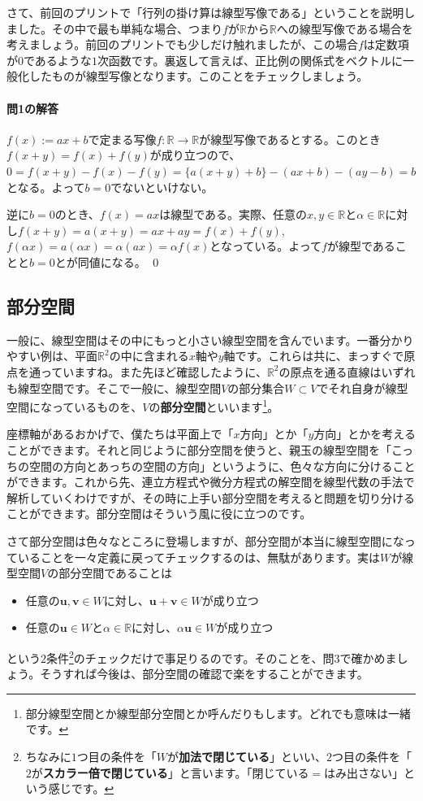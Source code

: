 さて、前回のプリントで「行列の掛け算は線型写像である」ということを説明しました。その中で最も単純な場合、つまり$f$が$\mathbb{R}$から$\mathbb{R}$への線型写像である場合を考えましょう。前回のプリントでも少しだけ触れましたが、この場合$f$は定数項が$0$であるような$1$次函数です。裏返して言えば、正比例の関係式をベクトルに一般化したものが線型写像となります。このことをチェックしましょう。

\paragraph{問1の解答}
$f(x) := ax + b$で定まる写像$f\colon\mathbb{R}\rightarrow\mathbb{R}$が線型写像であるとする。このとき$f(x + y) = f(x) + f(y)$が成り立つので、$0 = f(x + y) - f(x) - f(y) = \{a(x + y) + b\} - (ax + b) - (ay - b) = b$となる。よって$b = 0$でないといけない。

逆に$b = 0$のとき、$f(x) = ax$は線型である。実際、任意の$x, y\in\mathbb{R}$と$\alpha\in\mathbb{R}$に対し$f(x + y) = a(x + y) = ax + ay = f(x) + f(y)$, $f(\alpha x) = a (\alpha x) = \alpha (ax) = \alpha f(x)$となっている。よって$f$が線型であることと$b = 0$とが同値になる。 \qed

\subsection{部分空間}

一般に、線型空間はその中にもっと小さい線型空間を含んでいます。一番分かりやすい例は、平面$\mathbb{R}^2$の中に含まれる$x$軸や$y$軸です。これらは共に、まっすぐで原点を通っていますね。また先ほど確認したように、$\mathbb{R}^2$の原点を通る直線はいずれも線型空間です。そこで一般に、線型空間$V$の部分集合$W\subset V$でそれ自身が線型空間になっているものを、$V$の\textbf{部分空間}といいます\footnote{$部分線型空間$とか$線型部分空間$とか呼んだりもします。どれでも意味は一緒です。}。

座標軸があるおかげで、僕たちは平面上で「$x$方向」とか「$y$方向」とかを考えることができます。それと同じように部分空間を使うと、親玉の線型空間を「こっちの空間の方向とあっちの空間の方向」というように、色々な方向に分けることができます。これから先、連立方程式や微分方程式の解空間を線型代数の手法で解析していくわけですが、その時に上手い部分空間を考えると問題を切り分けることができます。部分空間はそういう風に役に立つのです。

さて部分空間は色々なところに登場しますが、部分空間が本当に線型空間になっていることを一々定義に戻ってチェックするのは、無駄があります。実は$W$が線型空間$V$の部分空間であることは
\begin{itemize}
\item 任意の$\bm{u}, \bm{v}\in W$に対し、$\bm{u} + \bm{v} \in W$が成り立つ
\item 任意の$\bm{u}\in W$と$\alpha \in \mathbb{R}$に対し、$\alpha \bm{u}\in W$が成り立つ
\end{itemize}
という$2$条件\footnote{ちなみに$1$つ目の条件を「$W$が\textbf{加法で閉じている}」といい、$2$つ目の条件を「$2$が\textbf{スカラー倍で閉じている}」と言います。「閉じている$=$はみ出さない」という感じです。}のチェックだけで事足りるのです。そのことを、問3で確かめましょう。そうすれば今後は、部分空間の確認で楽をすることができます。

